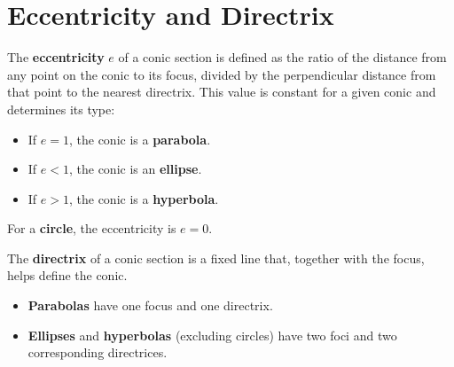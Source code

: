 \documentclass{article}
\begin{document}
\section*{Eccentricity and Directrix}

\begin{definitionbox}The \textbf{eccentricity} \( e \) of a conic section is defined as the ratio of the distance from any point on the conic to its focus, divided by the perpendicular distance from that point to the nearest directrix. This value is constant for a given conic and determines its type:
\begin{itemize}
    \item If \( e = 1 \), the conic is a \textbf{parabola}.
    \item If \( e < 1 \), the conic is an \textbf{ellipse}.
    \item If \( e > 1 \), the conic is a \textbf{hyperbola}.
\end{itemize}

\begin{remarkbox}
For a \textbf{circle}, the eccentricity is \( e = 0 \).
\end{remarkbox}

The \textbf{directrix} of a conic section is a fixed line that, together with the focus, helps define the conic. 
\begin{itemize}
    \item \textbf{Parabolas} have one focus and one directrix.
    \item \textbf{Ellipses} and \textbf{hyperbolas} (excluding circles) have two foci and two corresponding directrices.
\end{itemize}
\end{definitionbox}
\end{document}
